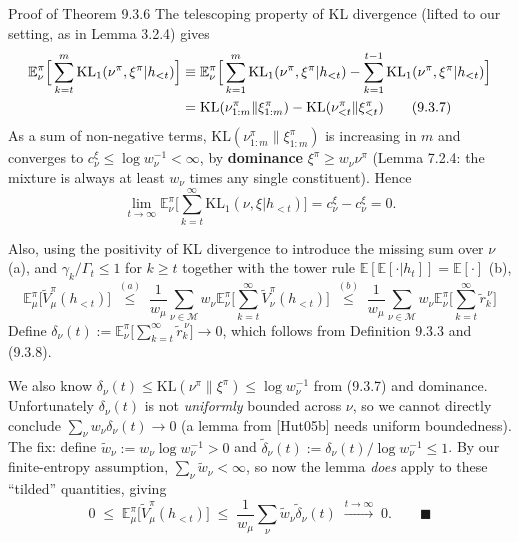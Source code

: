 \documentclass[aspectratio=169,10pt]{beamer}
\newcommand{\E}{\mathbb{E}}
\begin{document}
\begin{frame}[allowframebreaks]{Proof of Theorem 9.3.6}
  The telescoping property of KL divergence (lifted to our setting, as in
  Lemma 3.2.4) gives
  \begin{align}
    \E^\pi_\nu\Big[\sum_{k=t}^m \mathrm{KL}_1(\nu^\pi,\xi^\pi|h_{<t})\Big]
      &\equiv \E^\pi_\nu\Big[\sum_{k=1}^m\mathrm{KL}_1(\nu^\pi,\xi^\pi|h_{<t}) - \sum_{k=1}^{t-1}\mathrm{KL}_1(\nu^\pi,\xi^\pi|h_{<t})\Big] \notag\\
      &= \mathrm{KL}(\nu^\pi_{1:m}\|\xi^\pi_{1:m}) - \mathrm{KL}(\nu^\pi_{<t}\|\xi^\pi_{<t}) \tag{9.3.7}
  \end{align}
  As a sum of non-negative terms, $\mathrm{KL}(\nu^\pi_{1:m}\|\xi^\pi_{1:m})$
  is increasing in $m$ and converges to $c^\xi_\nu\le\log w_\nu^{-1}<\infty$,
  by \textbf{dominance} $\xi^\pi\ge w_\nu\nu^\pi$ (Lemma 7.2.4: the mixture
  is always at least $w_\nu$ times any single constituent). Hence
  \[
    \lim_{t\to\infty}\E^\pi_\nu\Big[\sum_{k=t}^\infty \mathrm{KL}_1(\nu,\xi|h_{<t})\Big] = c^\xi_\nu - c^\xi_\nu = 0. \tag{9.3.8}
  \]

  \framebreak
  Also, using the positivity of KL divergence to introduce the missing sum
  over $\nu$ (a), and $\gamma_k/\Gamma_t\le1$ for $k\ge t$ together with
  the tower rule $\E[\E[\cdot|h_t]]=\E[\cdot]$ (b),
  \[
    \E^\pi_\mu\big[\tilde V^\pi_\mu(h_{<t})\big]
      \;\overset{(a)}{\le}\; \frac{1}{w_\mu}\sum_{\nu\in\mathcal{M}} w_\nu \E^\pi_\nu\Big[\sum_{k=t}^\infty \tilde V^\pi_\nu(h_{<t})\Big]
      \;\overset{(b)}{\le}\; \frac{1}{w_\mu}\sum_{\nu\in\mathcal{M}} w_\nu \E^\pi_\nu\Big[\sum_{k=t}^\infty \tilde r_k^{\,\nu}\Big] \tag{9.3.9}
  \]
  Define $\delta_\nu(t):=\E^\pi_\nu\big[\sum_{k=t}^\infty \tilde r_k^{\,\nu}\big]\to0$, which follows from Definition 9.3.3 and (9.3.8).

  \framebreak
  We also know $\delta_\nu(t)\le\mathrm{KL}(\nu^\pi\|\xi^\pi)\le\log w_\nu^{-1}$
  from (9.3.7) and dominance. Unfortunately $\delta_\nu(t)$ is not
  \emph{uniformly} bounded across $\nu$, so we cannot directly conclude
  $\sum_\nu w_\nu\delta_\nu(t)\to0$ (a lemma from [Hut05b] needs uniform
  boundedness). The fix: define
  $\tilde w_\nu := w_\nu\log w_\nu^{-1} > 0$ and
  $\tilde\delta_\nu(t) := \delta_\nu(t)/\log w_\nu^{-1} \le 1$. By our
  finite-entropy assumption, $\sum_\nu\tilde w_\nu<\infty$, so now the
  lemma \emph{does} apply to these ``tilded'' quantities, giving
  \[
    0 \;\le\; \E^\pi_\mu\big[\tilde V^\pi_\mu(h_{<t})\big] \;\le\; \frac{1}{w_\mu}\sum_\nu \tilde w_\nu\tilde\delta_\nu(t) \;\xrightarrow{t\to\infty}\; 0. \qquad\blacksquare
  \]
\end{frame}
\end{document}
